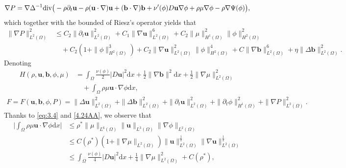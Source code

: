 \documentclass[11pt]{article}
\newcommand{\Dv}{{\rm div}}
\numberwithin{equation}{section}
\begin{document}
\begin{equation*} \nabla P =\nabla\Delta^{-1}\Dv\big(-\rho\partial_t\mathbf{u}-\rho(\mathbf{u}\cdot\nabla)\mathbf{u}+(\mathbf{b}\cdot\nabla)\mathbf{b}+\nu'(\phi)D\mathbf{u}\nabla\phi+\rho\mu\nabla\phi-\rho\nabla\Psi(\phi)\big),
\end{equation*}
which together with  the bounded of Riesz's  operator yields that
\begin{equation}\begin{split}\label{3.6-2} \|\nabla P\|_{L^2(\Omega)}^2&\leq C_2\|\partial_t\mathbf{u}\|_{L^2(\Omega)}^2+C_1\|\nabla\mathbf{u}\|_{L^2(\Omega)}^6+C_2\|\mu\|_{H^1(\Omega)}^2\|\phi\|_{H^2(\Omega)}^2
 \\&\quad+C_2(1 + \|\phi\|_{H^2(\Omega)}^3)+ C_2\|\nabla\mathbf{u}\|_{L^2(\Omega)}^2\|\phi\|_{H^2(\Omega)}^4+C\|\nabla\mathbf{b}\|_{L^2(\Omega)}^{6}+\eta
\|\Delta\mathbf{b}\|_{L^2(\Omega)}^{2}.
\end{split}\end{equation}
Denoting
\begin{equation*}
\begin{split}\label{4.20}
H(\rho,\mathbf{u},\mathbf{b},\phi,\mu)&
=\int_{\Omega}\frac{\nu(\phi)}{2}|D\mathbf{u}|^2\mathrm{d}x
+\frac{1}{2}\|\nabla\mathbf{b}\|^2\mathrm{d}x+\frac{1}{2}\|\nabla\mu\|_{L^2(\Omega)}^2
\\
&\quad+\int_{\Omega}\rho\mu\mathbf{u}\cdot\nabla\phi\mathrm{d}x,
\end{split}
\end{equation*}
\begin{align*}
F=F(\mathbf{u},\mathbf{b},\phi,P)=\|\Delta \mathbf{u}\|_{L^2(\Omega)}^2+\|\Delta \mathbf{b}\|_{L^2(\Omega)}^2+\|\partial_t \mathbf{u}\|_{L^2(\Omega)}^2 +\|\partial_t\phi\|_{H^1(\Omega)}^2+\|\nabla P\|_{L^2(\Omega)}^2.
\end{align*}
Thanks to \eqref{eq:3.4} and \eqref{4.24AA}, we observe that
\begin{equation}
\begin{split}\label{4.21}
\Big|\int_{\Omega}\rho\mu\mathbf{u}\cdot\nabla\phi\mathrm{d}x \Big|&\leq \rho^*\|\mu\|_{L^6(\Omega)}\|\mathbf{u}\|_{L^3(\Omega)}\|\nabla\phi\|_{L^2(\Omega)}\\
&\leq C(\rho^*)(1 + \|\nabla\mu\|_{L^2(\Omega)})\|\mathbf{u}\|_{L^2(\Omega)}^{\frac{1}{2}}
\|\nabla\mathbf{u}\|_{L^2(\Omega)}^{\frac{1}{2}} \\
&\leq \int_{\Omega}\frac{\nu(\phi)}{4}|D\mathbf{u}|^2\mathrm{d}x
+\frac{1}{4}\|\nabla\mu\|_{L^2(\Omega)}^2 +C(\rho^*),
\end{split}
\end{equation}
\end{document}
